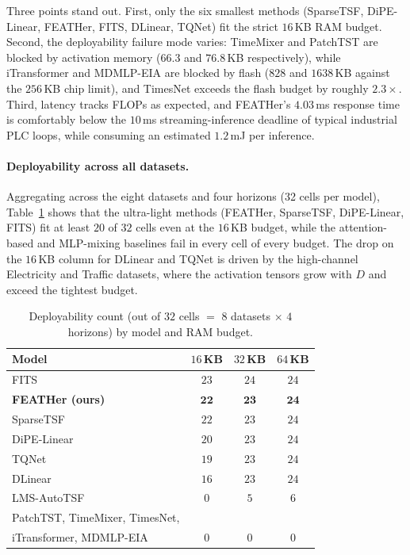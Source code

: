 \documentclass[journal]{IEEEtran}
\theoremstyle{remark}
\begin{document}
Three points stand out. First, only the six smallest methods
(SparseTSF, DiPE-Linear, FEATHer, FITS, DLinear, TQNet) fit the
strict $16$\,KB RAM budget. Second, the deployability failure mode
varies: TimeMixer and PatchTST are blocked by activation memory
($66.3$ and $76.8$\,KB respectively), while iTransformer and
MDMLP-EIA are blocked by flash ($828$ and $1638$\,KB against the
$256$\,KB chip limit), and TimesNet exceeds the flash budget by
roughly $2.3{\times}$. Third, latency tracks FLOPs as expected, and
FEATHer's $4.03$\,ms response time is comfortably below the
$10$\,ms streaming-inference deadline of typical industrial PLC
loops, while consuming an estimated $1.2$\,mJ per inference.

\paragraph{Deployability across all datasets.}
Aggregating across the eight datasets and four horizons
(32 cells per model), Table~\ref{tab:edge-counts} shows that the
ultra-light methods (FEATHer, SparseTSF, DiPE-Linear, FITS) fit at
least $20$ of $32$ cells even at the $16$\,KB budget, while the
attention-based and MLP-mixing baselines fail in every cell of
every budget. The drop on the $16$\,KB column for DLinear and TQNet
is driven by the high-channel Electricity and Traffic datasets,
where the activation tensors grow with $D$ and exceed the
tightest budget.

\begin{table}[t]
\centering
\caption{Deployability count (out of $32$ cells $=$ $8$ datasets
$\times$ $4$ horizons) by model and RAM budget.}
\label{tab:edge-counts}
\small
\begin{tabular}{lccc}
\toprule
Model               & $16$\,KB & $32$\,KB & $64$\,KB \\
\midrule
FITS                & $23$ & $24$ & $24$ \\
\textbf{FEATHer (ours)} & $\mathbf{22}$ & $\mathbf{23}$ & $\mathbf{24}$ \\
SparseTSF           & $22$ & $23$ & $24$ \\
DiPE-Linear         & $20$ & $23$ & $24$ \\
TQNet               & $19$ & $23$ & $24$ \\
DLinear             & $16$ & $23$ & $24$ \\
LMS-AutoTSF         &  $0$ &  $5$ &  $6$ \\
PatchTST, TimeMixer, TimesNet, &  &  & \\
\quad iTransformer, MDMLP-EIA & $0$ & $0$ & $0$ \\
\bottomrule
\end{tabular}
\end{table}
\end{document}
